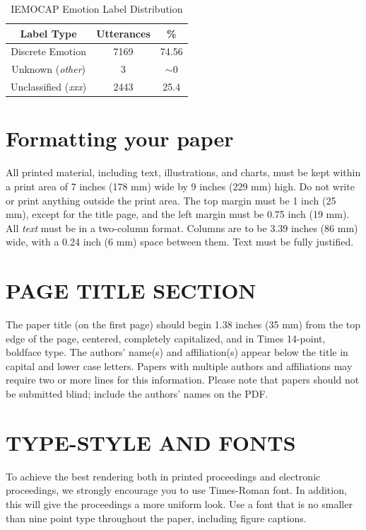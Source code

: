 \documentclass{article}
\begin{document}
\begin{table}[htb]
\centering
\begin{tabular}{| c | c c |}
\toprule
\textbf{Label Type} & \textbf{Utterances} & \textbf{\%}\\
\midrule
Discrete Emotion & 7169       & 74.56         \\
Unknown (\textit{other})          & 3          & $\sim$0       \\
Unclassified (\textit{xxx})           & 2443       & 25.4          \\
\bottomrule
\bottomrule
\end{tabular}
\caption{IEMOCAP Emotion Label Distribution}
\end{table}

\section{Formatting your paper}
\label{sec:format}

All printed material, including text, illustrations, and charts, must be kept
within a print area of 7 inches (178 mm) wide by 9 inches (229 mm) high. Do
not write or print anything outside the print area. The top margin must be 1
inch (25 mm), except for the title page, and the left margin must be 0.75 inch
(19 mm).  All {\it text} must be in a two-column format. Columns are to be 3.39
inches (86 mm) wide, with a 0.24 inch (6 mm) space between them. Text must be
fully justified.

\section{PAGE TITLE SECTION}
\label{sec:pagestyle}

The paper title (on the first page) should begin 1.38 inches (35 mm) from the
top edge of the page, centered, completely capitalized, and in Times 14-point,
boldface type.  The authors' name(s) and affiliation(s) appear below the title
in capital and lower case letters.  Papers with multiple authors and
affiliations may require two or more lines for this information. Please note
that papers should not be submitted blind; include the authors' names on the
PDF.

\section{TYPE-STYLE AND FONTS}
\label{sec:typestyle}

To achieve the best rendering both in printed proceedings and electronic proceedings, we
strongly encourage you to use Times-Roman font.  In addition, this will give
the proceedings a more uniform look.  Use a font that is no smaller than nine
point type throughout the paper, including figure captions.
\end{document}
